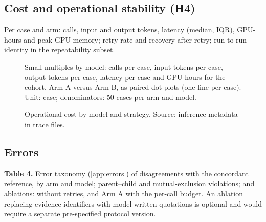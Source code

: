 \subsection{Cost and operational stability (H4)}

\begin{resultspending}
Per case and arm: calls, input and output tokens, latency (median, IQR), GPU-hours and peak GPU memory; retry rate
and recovery after retry; run-to-run identity in the repeatability subset.
\end{resultspending}

\begin{figure}[tbp]
\begin{resultspending}[title={Figure 6 --- Operational cost (RESULTS\_PENDING)}]
Small multiples by model: calls per case, input tokens per case, output tokens per case, latency per case and
GPU-hours for the cohort, Arm A versus Arm B, as paired dot plots (one line per case). Unit: case; denominators: 50
cases per arm and model.
\end{resultspending}
\caption{Operational cost by model and strategy. Source: inference metadata in trace files.}
\label{fig:cost}
\end{figure}

\subsection{Errors}

\begin{resultspending}
\textbf{Table 4.} Error taxonomy (\ref{app:errors}) of disagreements with the concordant reference, by arm
and model; parent--child and mutual-exclusion violations; and ablations: without retries, and Arm A with the
per-call budget. An ablation replacing evidence identifiers with model-written quotations is optional and would
require a separate pre-specified protocol version.
\end{resultspending}
